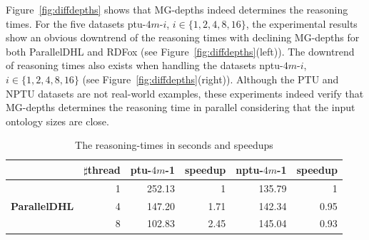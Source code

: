 Figure~\ref{fig:diffdepths} shows that MG-depths indeed determines
the reasoning times.
For the five datasets ptu-$4m$-$i$, $i\in\{1,2,4,8,16\}$, the experimental
results show an obvious downtrend of the reasoning times with declining MG-depths for
both ParallelDHL and RDFox (see Figure~\ref{fig:diffdepths}(left)).
The downtrend of reasoning times also exists
when handling the datasets nptu-$4m$-$i$, $i\in\{1,2,4,8,16\}$ (see Figure~\ref{fig:diffdepths}(right)).
Although the PTU and NPTU datasets are not real-world examples, these experiments indeed
verify that MG-depths determines the reasoning time in parallel
considering that the input ontology sizes are close.

\begin{table}
\centering
\caption{The reasoning-times in seconds and speedups}
\begin{tabular}{|l|r|r|r|r|r|}
\hline
&\small$\sharp$thread&ptu-$4m$-1&speedup&nptu-$4m$-1&speedup\\
\hline
\multirow{5}{*}{ \small{\textbf{ParallelDHL}}}&1&252.13&1&135.79&1\\
                                &4&147.20&1.71&142.34&0.95\\
                                &8&102.83&2.45&145.04&0.93\\

\end{tabular}
\end{table}
